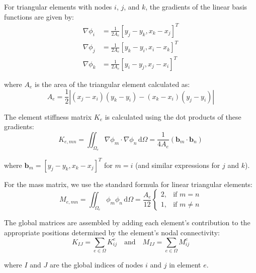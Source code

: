\documentclass[10pt,letterpaper]{article}
\begin{document}
For triangular elements with nodes $i$, $j$, and $k$, the gradients of the linear basis functions are given by:
\begin{align}
\nabla \phi_i &= \frac{1}{2A_e}[y_j - y_k, x_k - x_j]^{T} \\
\nabla \phi_j &= \frac{1}{2A_e}[y_k - y_i, x_i - x_k]^{T} \\
\nabla \phi_k &= \frac{1}{2A_e}[y_i - y_j, x_j - x_i]^{T}
\end{align}

where $A_e$ is the area of the triangular element calculated as:
\begin{equation}
A_e = \frac{1}{2}|(x_j-x_i)(y_k-y_i) - (x_k-x_i)(y_j-y_i)|
\end{equation}

The element stiffness matrix $K_e$ is calculated using the dot products of these gradients:
\begin{equation}
K_{e,mn} = \iint_{\Omega_e} \nabla \phi_m \cdot \nabla \phi_n \, \mathrm{d}\Omega = \frac{1}{4A_e} (\mathbf{b}_m \cdot \mathbf{b}_n)
\end{equation}

where $\mathbf{b}_m = [y_j - y_k, x_k - x_j]^{T}$ for $m=i$ (and similar expressions for $j$ and $k$).

For the mass matrix, we use the standard formula for linear triangular elements:
\begin{equation}
M_{e,mn} = \iint_{\Omega_e} \phi_m \phi_n \, \mathrm{d}\Omega = \frac{A_e}{12}
\begin{cases}
2, & \text{if } m = n \\
1, & \text{if } m \neq n
\end{cases}
\end{equation}

The global matrices are assembled by adding each element's contribution to the appropriate positions determined by the element's nodal connectivity:
\begin{equation}
K_{IJ} = \sum_{e \in \Omega} K^e_{ij} \quad \text{and} \quad M_{IJ} = \sum_{e \in \Omega} M^e_{ij}
\end{equation}

where $I$ and $J$ are the global indices of nodes $i$ and $j$ in element $e$.
\end{document}

